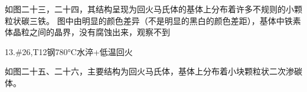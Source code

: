 \documentclass[a4paper,utf8]{article}
\begin{document}
如图二十三，二十四，其结构呈现为回火马氏体的基体上分布着许多不规则的小颗粒状碳三铁。
图中由明显的颜色差异（不是明显的黑白的颜色差距），基体中铁素体晶粒之间的晶界，没有腐蚀出来，观察不到
\begin{figure}[!ht]
    \begin{floatrow}
            
    \end{floatrow}

\end{figure}



13.\#26,T12钢780°C水淬+低温回火

如图二十五、二十六，主要结构为回火马氏体，基体上分布着小块颗粒状二次渗碳体。
\end{document}

